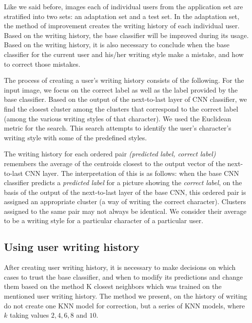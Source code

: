 \documentclass{article}
\begin{document}
Like we said before, images each of individual users from the application set are stratified into two sets: an adaptation set and a test set. %
In the adaptation set, the method of improvement creates the writing history of each individual user. 
Based on the writing history, the base classifier will be improved during its usage. 
Based on the writing history, it is also necessary to conclude when the base classifier for the current user and his/her writing style make a mistake, and how to correct those mistakes. 

The process of creating a user's writing history consists of the following. 
For the input image, we focus on the correct label as well as the label provided by the base classifier. 
Based on the output of the next-to-last layer of CNN classifier, we find the closest cluster among the clusters that correspond to the correct label (among the various writing styles of that character). 
We used the Euclidean metric for the search. %
This search attempts to identify the user's character's writing style with some of the predefined styles.  

The writing history for each ordered pair \textit{(predicted label, correct label)} remembers the average of the centroids closest to the output vector of the next-to-last CNN layer. 
The interpretation of this is as follows: when the base CNN classifier predicts %
 a \textit{predicted label} for a picture showing the \textit{correct label}, 
on the basis of the output of the next-to-last layer of the base CNN, this ordered pair is assigned an appropriate cluster (a way of writing the correct character). 
Clusters assigned to the same pair may not always be identical. 
We consider their average to be a writing style for a particular character of a particular user. 

\subsection{Using user writing history}

After creating user writing history, it is necessary to make decisions on which cases to trust the base classifier, and when to modify its predictions and change them based on the method K closest neighbors 
which was trained on the mentioned user writing history. 
The method we present, on the history of writing do not create one KNN model for correction, but a series of KNN models, where $k$ taking values $2, 4, 6, 8$ and $10$. 
\end{document}
